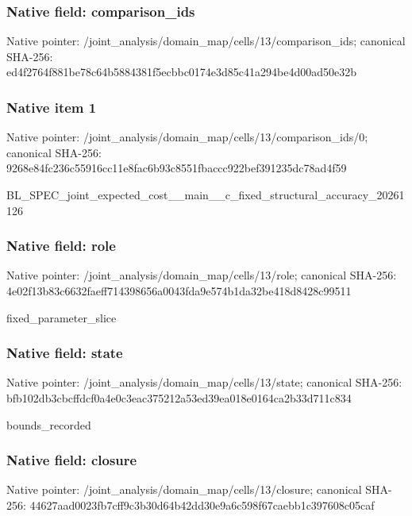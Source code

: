 \documentclass[10pt,a4paper]{article}
\begin{document}
\subsubsection{Native field: comparison\_ids}


Native pointer: /joint\_analysis/domain\_m\allowbreak{}ap/cells/13/comparison\_i\allowbreak{}ds; canonical SHA-256: ed4f2764f881be78c64b5884\allowbreak{}381f5ecbbc0174e3d85c41a2\allowbreak{}94be4d00ad50e32b



\subsubsection{Native item 1}


Native pointer: /joint\_analysis/domain\_m\allowbreak{}ap/cells/13/comparison\_i\allowbreak{}ds/0; canonical SHA-256: 9268e84fc236c55916cc11e8\allowbreak{}fac6b93c8551fbaccc922bef\allowbreak{}391235dc78ad4f59


BL\_SPEC\_joint\_expected\_c\allowbreak{}ost\_\_main\_\_c\_fixed\_struc\allowbreak{}tural\_accuracy\_20261126


\subsubsection{Native field: role}


Native pointer: /joint\_analysis/domain\_m\allowbreak{}ap/cells/13/role; canonical SHA-256: 4e02f13b83c6632faeff7143\allowbreak{}98656a0043fda9e574b1da32\allowbreak{}be418d8428c99511


fixed\_parameter\_slice


\subsubsection{Native field: state}


Native pointer: /joint\_analysis/domain\_m\allowbreak{}ap/cells/13/state; canonical SHA-256: bfb102db3cbcffdcf0a4e0c3\allowbreak{}eac375212a53ed39ea018e01\allowbreak{}64ca2b33d711c834


bounds\_recorded


\subsubsection{Native field: closure}


Native pointer: /joint\_analysis/domain\_m\allowbreak{}ap/cells/13/closure; canonical SHA-256: 44627aad0023fb7cff9c3b30\allowbreak{}d64b42dd30e9a6c598f67cae\allowbreak{}bb1c397608c05caf
\end{document}
